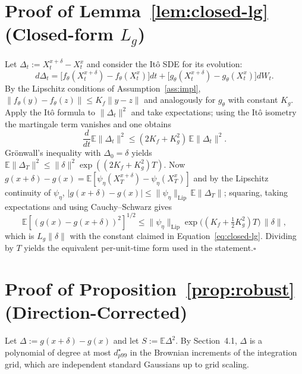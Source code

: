 \documentclass{ieeeaccess}
\newcommand{\Exp}{\mathbb{E}}
\newcommand{\Lip}{\mathrm{Lip}}
\begin{document}
\section{Proof of Lemma~\ref{lem:closed-lg} (Closed-form $L_g$)}
Let $\Delta_t := X_t^{x+\delta} - X_t^x$ and consider the Itô SDE for
its evolution:
\begin{equation*}
  d\Delta_t = \bigl[f_\theta(X_t^{x+\delta})-f_\theta(X_t^x)\bigr]dt +
              \bigl[g_\theta(X_t^{x+\delta})-g_\theta(X_t^x)\bigr]dW_t.
\end{equation*}
By the Lipschitz conditions of Assumption~\ref{ass:impl},
$\|f_\theta(y)-f_\theta(z)\|\leq K_f\|y-z\|$ and analogously for $g_\theta$
with constant $K_g$. Apply the Itô formula to $\|\Delta_t\|^2$ and
take expectations; using the Itô isometry the martingale term vanishes
and one obtains
\begin{equation*}
  \frac{d}{dt}\Exp\|\Delta_t\|^2 \leq (2K_f + K_g^2)\,\Exp\|\Delta_t\|^2.
\end{equation*}
Grönwall's inequality with $\Delta_0=\delta$ yields
$\Exp\|\Delta_T\|^2 \leq \|\delta\|^2 \exp((2K_f+K_g^2)T)$. Now
$g(x+\delta)-g(x) = \Exp[\psi_\eta(X_T^{x+\delta})-\psi_\eta(X_T^x)]$
and by the Lipschitz continuity of $\psi_\eta$,
$|g(x+\delta)-g(x)|\leq \|\psi_\eta\|_\Lip\,\Exp\|\Delta_T\|$;
squaring, taking expectations and using Cauchy--Schwarz gives
\begin{equation*}
  \Exp[(g(x)-g(x+\delta))^2]^{1/2}
   \leq \|\psi_\eta\|_\Lip \exp\!\bigl((K_f+\tfrac12 K_g^2)T\bigr)\,\|\delta\|,
\end{equation*}
which is $L_g\|\delta\|$ with the constant claimed in
Equation~\eqref{eq:closed-lg}. Dividing by $T$ yields the equivalent
per-unit-time form used in the statement.\hfill$\square$

\section{Proof of Proposition~\ref{prop:robust} (Direction-Corrected)}
Let $\Delta := g(x+\delta) - g(x)$ and let $S:=\Exp\Delta^2$. By
Section~4.1, $\Delta$ is a polynomial of degree at most $d^\star_{p99}$
in the Brownian increments of the integration grid, which are
independent standard Gaussians up to grid scaling.
\end{document}
